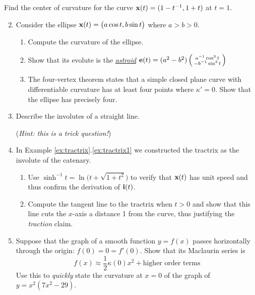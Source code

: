 \goodbreak




\begin{exercises}
	\exstart Find the center of curvature for the curve ${\mathbf{x}}(t)=(1-t^{-1},1+t)$ at $t=1$.
	
	
	\begin{enumerate}\setcounter{enumi}{1}
	  \item Consider the ellipse ${\mathbf{x}}(t)=\bigl(a\cos t,b\sin t\bigr)$ where $a>b>0$.
	  \begin{enumerate}
	    \item Compute the curvature of the ellipse.
	    
	    \item Show that its evolute is the \emph{\href{https://en.wikipedia.org/wiki/Astroid}{astroid}} ${\mathbf{e}}(t)=(a^2-b^2)\left(\begin{smallmatrix}a^{-1}\cos^3t\\-b^{-1}\sin^3t\end{smallmatrix}\right)$
	    
	    \item The four-vertex theorem states that a simple closed plane curve with differentiable curvature has at least four points where $\kappa'=0$. Show that the ellipse has precisely four.
	  \end{enumerate}
	  
	  
	  \item Describe the involutes of a straight line.\par
	  (\emph{Hint: this is a trick question!})
	  
	 
		\item In Example \ref*{ex:tractrix}.\ref{ex:tractrix1} we constructed the tractrix as the involute of the catenary.
		\begin{enumerate}
		  \item Use $\sinh^{-1}\!t=\ln\bigl(t+\sqrt{1+t^2}\bigr)$ to verify that ${\mathbf{x}}(t)$ has unit speed and thus confirm the derivation of ${\mathbf{i}}(t)$.
		  
		  \item Compute the tangent line to the tractrix when $t>0$ and show that this line cuts the $x$-axis a distance 1 from the curve, thus justifying the \emph{traction} claim.
		  
	 	\end{enumerate}
	
	
		\item\label{exs:curvetaylor} Suppose that the graph of a smooth function $y=f(x)$ passes horizontally through the origin: $f(0)=0=f'(0)$. Show that its Maclaurin series is
		\[
			f(x)\approx \frac 12\kappa(0)x^2+\text{higher order terms}
		\]
		Use this to \emph{quickly} state the curvature at $x=0$ of the graph of $y=x^2(7x^2-29)$.
	

\end{enumerate}
\end{exercises}
